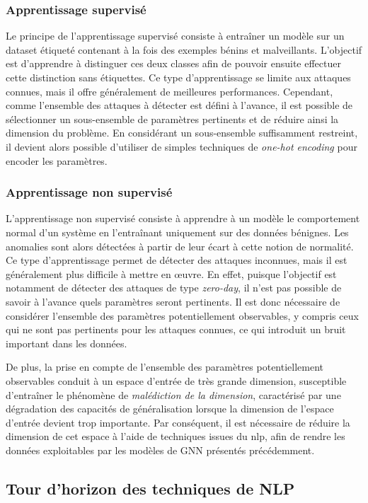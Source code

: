 \documentclass[a4paper,11pt,twoside]{StyleThese}
\begin{document}
\subsubsection{Apprentissage supervisé}
Le principe de l’apprentissage supervisé consiste à entraîner un modèle sur un dataset étiqueté contenant à la fois des exemples bénins et malveillants. L’objectif est d’apprendre à distinguer ces deux classes afin de pouvoir ensuite effectuer cette distinction sans étiquettes. Ce type d’apprentissage se limite aux attaques connues, mais il offre généralement de meilleures performances. Cependant, comme l’ensemble des attaques à détecter est défini à l’avance, il est possible de sélectionner un sous-ensemble de paramètres pertinents et de réduire ainsi la dimension du problème. En considérant un sous-ensemble suffisamment restreint, il devient alors possible d’utiliser de simples techniques de \textit{one-hot encoding} pour encoder les paramètres.

\subsubsection{Apprentissage non supervisé}
L’apprentissage non supervisé consiste à apprendre à un modèle le comportement normal d’un système en l’entraînant uniquement sur des données bénignes. Les anomalies sont alors détectées à partir de leur écart à cette notion de normalité. Ce type d’apprentissage permet de détecter des attaques inconnues, mais il est généralement plus difficile à mettre en œuvre. En effet, puisque l’objectif est notamment de détecter des attaques de type \textit{zero-day}, il n’est pas possible de savoir à l’avance quels paramètres seront pertinents. Il est donc nécessaire de considérer l’ensemble des paramètres potentiellement observables, y compris ceux qui ne sont pas pertinents pour les attaques connues, ce qui introduit un bruit important dans les données.

De plus, la prise en compte de l’ensemble des paramètres potentiellement observables conduit à un espace d’entrée de très grande dimension, susceptible d’entraîner le phénomène de \textit{malédiction de la dimension}, caractérisé par une dégradation des capacités de généralisation lorsque la dimension de l’espace d’entrée devient trop importante. Par conséquent, il est nécessaire de réduire la dimension de cet espace à l’aide de techniques issues du \gls{nlp}, afin de rendre les données exploitables par les modèles de GNN présentés précédemment.

\subsection{Tour d'horizon des techniques de NLP}
\end{document}
